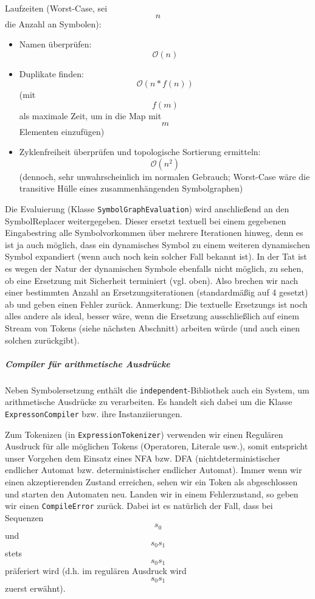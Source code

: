 Laufzeiten (Worst-Case, sei $$n$$ die Anzahl an Symbolen):
\begin{itemize}
\item Namen überprüfen: $$\mathcal{O}(n)$$
\item Duplikate finden: $$\mathcal{O}(n*f(n))$$ (mit $$f(m)$$ als maximale Zeit, um in die Map mit $$m$$ Elementen einzufügen)
\item Zyklenfreiheit überprüfen und topologische Sortierung ermitteln: $$\mathcal{O}(n^2)$$ (dennoch, sehr unwahrscheinlich im normalen Gebrauch; Worst-Case wäre die transitive Hülle eines zusammenhängenden Symbolgraphen)
\end{itemize}

Die Evaluierung (Klasse \texttt{SymbolGraphEvaluation}) wird anschließend an den SymbolReplacer weitergegeben. Dieser ersetzt textuell bei einem gegebenen Eingabestring alle Symbolvorkommen über mehrere Iterationen hinweg, denn es ist ja auch möglich, dass ein dynamisches Symbol zu einem weiteren dynamischen Symbol expandiert (wenn auch noch kein solcher Fall bekannt ist). In der Tat ist es wegen der Natur der dynamischen Symbole ebenfalls nicht möglich, zu sehen, ob eine Ersetzung mit Sicherheit terminiert (vgl. oben). Also brechen wir nach einer bestimmten Anzahl an Ersetzungsiterationen (standardmäßig auf 4 gesetzt) ab und geben einen Fehler zurück. Anmerkung: Die textuelle Ersetzungs ist noch alles andere als ideal, besser wäre, wenn die Ersetzung ausschließlich auf einem Stream von Tokens (siehe nächsten Abschnitt) arbeiten würde (und auch einen solchen zurückgibt).

\subparagraph{Compiler für arithmetische Ausdrücke}
Neben Symbolersetzung enthält die \texttt{independent}-Bibliothek auch ein System, um arithmetische Ausdrücke zu verarbeiten. Es handelt sich dabei um die Klasse \texttt{ExpressonCompiler} bzw. ihre Instanziierungen.

Zum Tokenizen (in \texttt{ExpressionTokenizer}) verwenden wir einen Regulären Ausdruck für alle möglichen Tokens (Operatoren, Literale usw.), somit entspricht unser Vorgehen dem Einsatz eines NFA bzw. DFA (nichtdeterministischer endlicher Automat bzw. deterministischer endlicher Automat). Immer wenn wir einen akzeptierenden Zustand erreichen, sehen wir ein Token als abgeschlossen und starten den Automaten neu. Landen wir in einem Fehlerzustand, so geben wir einen \texttt{CompileError} zurück. Dabei ist es natürlich der Fall, dass bei Sequenzen $$s_0$$ und $$s_0s_1$$ stets $$s_0s_1$$ präferiert wird (d.h. im regulären Ausdruck wird $$s_0s_1$$ zuerst erwähnt).

